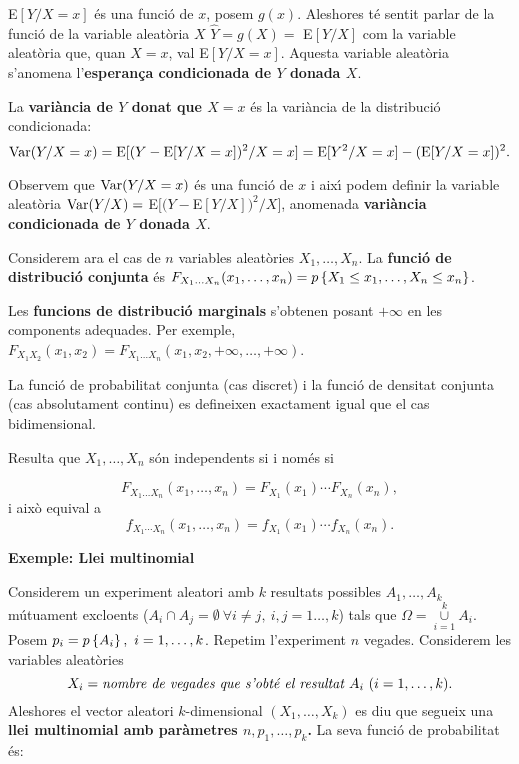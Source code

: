 E$[Y/X=x]$ \'es una funci\'o de $x$, posem $g(x)$. Aleshores t\'e sentit parlar
de la funci\'o de la variable aleat\`oria $X$ $\hat{Y} = g(X) =$
E$[Y/X]$ com la variable aleat\`oria que, quan $X=x$, val E$[Y/X=x]$. Aquesta
variable aleat\`oria s'anomena l'{\bf esperan\c ca condicionada de $Y$ donada
$X$}.

\begin{defin}
La {\bf vari\`ancia de $Y$ donat que
$X=x$}
\'es la vari\`ancia de la distribuci\'o
condicionada:
$${\rm Var} (Y/X=x) = {\rm E} [(Y-{\rm E}[Y/X=x])^2/X=x] = {\rm E} [Y^2/X=x] - ({\rm
E}[Y/X=x])^2.$$
\end{defin}

Observem que ${\rm Var} (Y/X=x)$ \'es una funci\'o de $x$ i aix\'{\i} podem definir la
variable
aleat\`oria ${\rm Var} (Y/X) =$ E$[(Y-$E$[Y/X])^2/X]$, anomenada {\bf vari\`ancia
condicionada de $Y$ donada $X$}.

Considerem ara el cas de $n$ variables aleat\`ories $X_1, \ldots , X_n$. La {\bf
funci\'o de distribuci\'o conjunta}
\'es $F_{X_1 \ldots X_n}(x_1, \ldots , x_n) = p\left\{X_1
\leq x_1, \ldots , X_n \leq x_n\right\}$.

Les {\bf funcions de distribuci\'o marginals}
 s'obtenen
posant $+\infty$ en les components adequades. Per exemple, $F_{X_1X_2}(x_1,x_2) = F_{X_1 \ldots
X_n}(x_1,
x_2, +\infty, \ldots , +\infty)$.

La funci\'o de probabilitat conjunta (cas discret) i la funci\'o 
de densitat conjunta
(cas absolutament continu) es defineixen exactament igual que el cas bidimensional.

Resulta que $X_1, \ldots , X_n$ s\'on independents si i nom\'es si

$$F_{X_1 \ldots X_n}(x_1, \ldots , x_n) = F_{X_1}(x_1) \cdots F_{X_n}(x_n),$$
i aix\`o equival a
$$f_{X_1 \cdots X_n}(x_1, \ldots , x_n) = f_{X_1}(x_1) \cdots f_{X_n}(x_n).$$

{\bf Exemple: Llei multinomial}

Considerem un experiment aleatori amb $k$ resultats possibles 
$A_1, \ldots , A_k$
m\'u\-tua\-ment excloents ($A_i \cap A_j = \emptyset \ \forall i \not = j, \>
i,j = 1 \ldots , k$) tals que  $\Omega = \mathop{\cup}\limits_{i=1}^k A_i$.
Posem $p_i = p\left\{A_i\right\}, \ i = 1, \ldots , k$. Repetim l'experiment $n$ vegades.
Considerem les variables aleat\`ories 
$$
X_i =\mbox{\it nombre de vegades que s'obt\'e el
resultat }A_i \ (i = 1, \ldots , k).$$
Aleshores el vector aleatori
$k$-dimensional $(X_1, \ldots , X_k)$ es diu que segueix una {\bf llei
multinomial amb par\`ametres $n, p_1, \ldots ,
p_k$.}
La seva funci\'o de probabilitat \'es:

